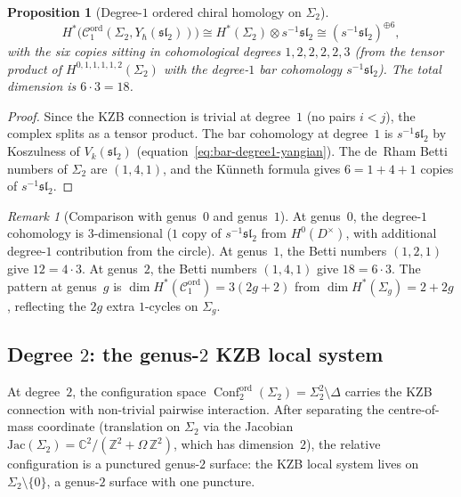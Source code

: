 \documentclass[11pt,reqno]{amsart}
\newtheorem{proposition}[theorem]{Proposition}
\theoremstyle{definition}
\theoremstyle{remark}
\newtheorem{remark}[theorem]{Remark}
\newcommand{\cC}{\mathcal{C}}
\DeclareMathOperator{\Conf}{Conf}
\newcommand{\CC}{\mathbb{C}}
\newcommand{\ZZ}{\mathbb{Z}}
\numberwithin{equation}{section}
\begin{document}
\begin{proposition}[Degree-$1$ ordered chiral homology on
$\Sigma_2$]
\label{prop:g2-degree1}
\begin{equation}\label{eq:g2-degree1-result}
  H^*\bigl(\cC_1^{\mathrm{ord}}(\Sigma_2,
  Y_\hbar(\mathfrak{sl}_2))\bigr)
  \cong H^*(\Sigma_2) \otimes s^{-1}\mathfrak{sl}_2
  \cong (s^{-1}\mathfrak{sl}_2)^{\oplus 6},
\end{equation}
with the six copies sitting in cohomological degrees
$1, 2, 2, 2, 2, 3$ \textup{(}from the tensor product of
$H^{0,1,1,1,1,2}(\Sigma_2)$ with the degree-$1$ bar
cohomology $s^{-1}\mathfrak{sl}_2$\textup{)}.
The total dimension is $6 \cdot 3 = 18$.
\end{proposition}

\begin{proof}
Since the KZB connection is trivial at degree~$1$
(no pairs $i < j$), the complex splits as a tensor
product. The bar cohomology at degree~$1$ is
$s^{-1}\mathfrak{sl}_2$ by
Koszulness of $V_k(\mathfrak{sl}_2)$
(equation~\eqref{eq:bar-degree1-yangian}). The de~Rham
Betti numbers of $\Sigma_2$ are $(1, 4, 1)$, and
the K\"unneth formula gives $6 = 1 + 4 + 1$ copies of
$s^{-1}\mathfrak{sl}_2$.
\end{proof}

\begin{remark}[Comparison with genus~$0$ and genus~$1$]
At genus~$0$, the degree-$1$ cohomology is
$3$-dimensional ($1$ copy of $s^{-1}\mathfrak{sl}_2$
from $H^0(D^\times)$, with additional degree-$1$
contribution from the circle). At genus~$1$, the Betti
numbers $(1,2,1)$ give $12 = 4 \cdot 3$. At genus~$2$,
the Betti numbers $(1,4,1)$ give $18 = 6 \cdot 3$. The
pattern at genus~$g$ is
$\dim H^*(\cC_1^{\mathrm{ord}}) = 3(2g + 2)$ from
$\dim H^*(\Sigma_g) = 2 + 2g$, reflecting the $2g$
extra $1$-cycles on $\Sigma_g$.
\end{remark}

\subsection{Degree $2$: the genus-$2$ KZB local system}
\label{subsec:g2-degree2}

At degree~$2$, the configuration space
$\Conf_2^{\mathrm{ord}}(\Sigma_2) = \Sigma_2^2 \setminus
\Delta$ carries the KZB connection with non-trivial
pairwise interaction. After separating the
centre-of-mass coordinate (translation on $\Sigma_2$ via
the Jacobian $\mathrm{Jac}(\Sigma_2) =
\CC^2/(\ZZ^2 + \Omega\,\ZZ^2)$, which has dimension~$2$),
the relative configuration is a punctured
genus-$2$ surface:
the KZB local system lives on $\Sigma_2 \setminus \{0\}$,
a genus-$2$ surface with one puncture.
\end{document}
